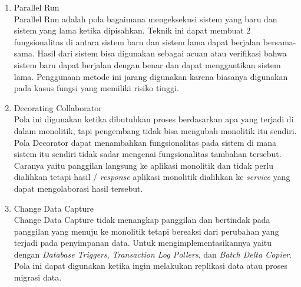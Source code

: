 \begin{enumerate}[leftmargin=1.3cm]
	\item Parallel Run\\
		Parallel Run adalah pola bagaimana mengeksekusi sistem yang baru dan sistem yang lama ketika dipisahkan. Teknik ini dapat membuat 2 fungsionalitas di antara sistem baru dan sistem lama dapat berjalan bersama-sama. Hasil dari sistem bisa digunakan sebagai acuan atau verifikasi bahwa sistem baru dapat berjalan dengan benar dan dapat menggantikan sistem lama. Penggunaan metode ini jarang digunakan karena biasanya digunakan pada kasus fungsi yang memiliki risiko tinggi.
	\item Decorating Collaborator\\
		Pola ini digunakan ketika dibutuhkan proses berdasarkan apa yang terjadi di dalam monolitik, tapi pengembang tidak bisa mengubah monolitik itu sendiri. Pola Decorator dapat menambahkan fungsionalitas pada sistem di mana sistem itu sendiri tidak sadar mengenai fungsionalitas tambahan tersebut. Caranya yaitu panggilan langsung ke aplikasi monolitik dan tidak perlu dialihkan tetapi hasil / \textit{response} aplikasi monolitik dialihkan ke \textit{service} yang dapat mengolaborasi hasil tersebut.
	\item Change Data Capture\\
		Change Data Capture tidak menangkap panggilan dan bertindak pada panggilan yang menuju ke monolitik tetapi bereaksi dari perubahan yang terjadi pada penyimpanan data. Untuk mengimplementasikannya yaitu dengan \textit{Database Triggers}, \textit{Transaction Log Pollers}, dan \textit{Batch Delta Copier}. Pola ini dapat digunakan ketika ingin melakukan replikasi data atau proses migrasi data.
\end{enumerate}	

